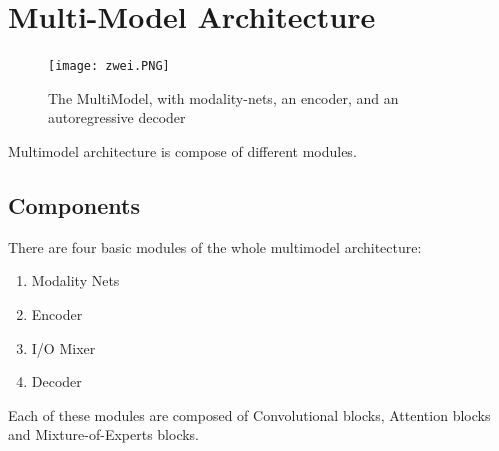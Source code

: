 \documentclass[12pt]{article}
\begin{document}
\section{Multi-Model Architecture}
\begin{center}
\begin{figure}[h]
  \centering
  \begin{minipage}[b]{1.0\textwidth}
    \texttt{[image: zwei.PNG]}
    \caption{The MultiModel, with modality-nets, an encoder, and an autoregressive decoder \cite{KaiserGSVPJU17}}
  \end{minipage}
\end{figure}
\end{center}
Multimodel architecture is compose of different modules.
\subsection{Components}
There are four basic modules of the whole multimodel architecture:
\begin{enumerate}
\item{Modality Nets}
\item{Encoder}
\item{I/O Mixer}
\item{Decoder}
\end{enumerate}

Each of these modules are composed of Convolutional blocks, Attention blocks and Mixture-of-Experts blocks.  
\end{document}
